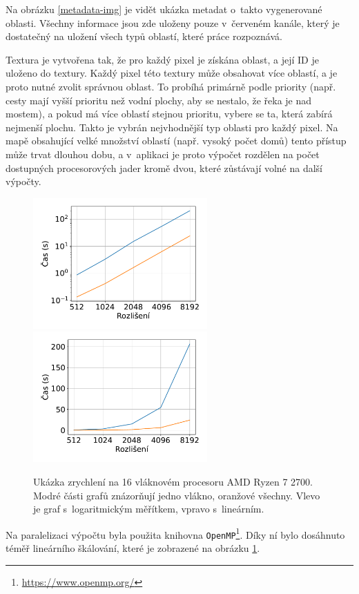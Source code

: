 Na obrázku \ref{metadata-img} je vidět ukázka metadat o~takto vygenerované oblasti. Všechny informace jsou zde uloženy pouze v~červeném kanále, který je dostatečný na uložení všech typů oblastí, které práce rozpoznává.

Textura je vytvořena tak, že pro každý pixel je získána oblast, a její ID je uloženo do textury. Každý pixel této textury může obsahovat více oblastí, a je proto nutné zvolit správnou oblast. To probíhá primárně podle priority (např. cesty mají vyšší prioritu než vodní plochy, aby se nestalo, že řeka je nad mostem), a pokud má více oblastí stejnou prioritu, vybere se ta, která zabírá nejmenší plochu. Takto je vybrán nejvhodnější typ oblasti pro každý pixel. Na mapě obsahující velké množství oblastí (např. vysoký počet domů) tento přístup může trvat dlouhou dobu, a v~aplikaci je proto výpočet rozdělen na počet dostupných procesorových jader kromě dvou, které zůstávají volné na další výpočty.

\begin{figure}[H]
	\centering
	\includegraphics[width=18em]{images/impl/graphs/metadata_log.pdf}
	\includegraphics[width=18em]{images/impl/graphs/metadata_linear.pdf}

	\caption[caption]{Ukázka zrychlení na 16 vláknovém procesoru AMD Ryzen 7 2700. Modré části grafů znázorňují jedno vlákno, oranžové všechny. Vlevo je graf s~logaritmickým měřítkem, vpravo s~lineárním.} 
	\label{metadata-graph}
\end{figure}
Na paralelizaci výpočtu byla použita knihovna \verb|OpenMP|\footnote{\href{https://www.openmp.org/}{https://www.openmp.org/}}. Díky ní bylo dosáhnuto téměř lineárního škálování, které je zobrazené na obrázku \ref{metadata-graph}.

